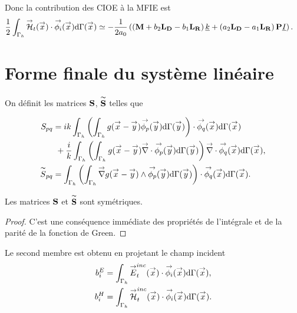     Donc la contribution des CIOE à la MFIE est
    \begin{equation*}
      \begin{aligned}
        \frac{1}{2}\int_{\Gamma_h} \vH_t(\vx) \cdot \phii(\vx) \dd{\Gamma}(\vx)
        &\simeq -\frac{1}{2a_0} \left( \left(\mM + b_2 \mLD - b_1 \mLR\right) \comp{k}  + \left( a_2 \mLD - a_1 \mLR\right) \mPP \comp{I} \right).
      \end{aligned}
    \end{equation*}


\section{Forme finale du système linéaire}

  \begin{defn}
    On définit les matrices \(\mS\), \(\mSt\) telles que

    \begin{align*}
      S_{pq}
        &= ik \int_{\Gamma_h} \left( \int_{\Gamma_h} g(\vx - \vy) \phip(\vy) \dd{\Gamma}(\vy) \right) \cdot \phiq (\vx)\dd{\Gamma}(\vx)\\
        \notag&~+ \frac{i}{k}\int_{\Gamma_h} \left( \int_{\Gamma_h} g(\vx - \vy) \vdiv \phip (\vy) \dd{\Gamma}(\vy) \right) \vdiv \phiq(\vx) \dd{\Gamma}(\vx),
      \\
      \tilde{S}_{pq}
        &= \int_{\Gamma_h} \left( \int_{\Gamma_h} \vgrad g(\vx - \vy) \pvect \phip(\vy) \dd{\Gamma}(\vy) \right) \cdot \phiq(\vx) \dd{\Gamma}(\vx).
    \end{align*}
  \end{defn}

  \begin{prop}
    Les matrices \(\mS\) et \(\mSt\) sont symétriques.
  \end{prop}
  \begin{proof}
    C'est une conséquence immédiate des propriétés de l'intégrale et de la parité de la fonction de Green.
  \end{proof}

  Le second membre est obtenu en projetant le champ incident
    \begin{align*}
      b_i^E &= \int_{\Gamma_h} \vE_t^{inc}(\vx) \cdot \phii(\vx)\dd{\Gamma}(\vx), \\
      b_i^H &= \int_{\Gamma_h} \vH_t^{inc}(\vx) \cdot \phii(\vx)\dd{\Gamma}(\vx).
    \end{align*}

